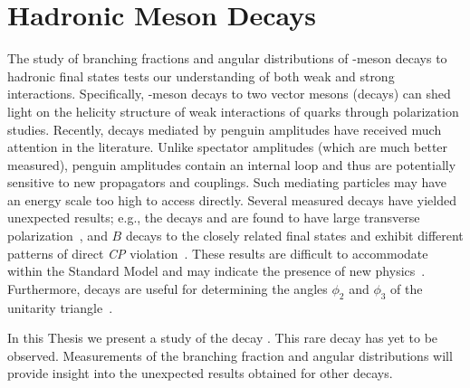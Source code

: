 \section{Hadronic \bm{\B} Meson Decays}
The study of branching fractions and angular distributions of \B-meson decays to hadronic final states tests our understanding of both weak and strong interactions. Specifically, \B-meson decays to two vector mesons (\Bvv decays) can shed light on the helicity structure of weak interactions of quarks through polarization studies. Recently, \B decays mediated by \bsqq penguin amplitudes have received much attention in the literature. Unlike \bc spectator amplitudes (which are much better measured), penguin amplitudes contain an internal loop and thus are potentially sensitive to new propagators and couplings. Such mediating particles may have an energy scale too high to access directly. Several measured \bsqq decays have yielded unexpected results; e.g., the decays \BToPhiKst and \BToRhoKstz are found to have large transverse polarization~\cite{belle_phiKstz,babar_phiKstz,belle_RhoPKstz,babar_RhoPKstz}, and $B$ decays to the closely related final states \KpPim and \KpPiz exhibit different patterns of direct \textit{CP} violation~\cite{kpiDCPV_babar, kpiDCPV_belle}. These results are difficult to accommodate within the Standard Model and may indicate the presence of new physics~\cite{Kagan QCD peng annih,Ladisa etal FSI,Cheng Chua Soni FSI,Colangelo FSI,charming penguins,magnetic penguin,new sets of form factors,Beneke etal Enhanced Electroweak Penguin Amplitudes,Li and Mishima Polarization in Bvv decays,Cheng Yang BR and Polarization in Bvv decays,Grossman Beyond the SM with B and K physics,RH currents,scalar interactions,NP operators}. Furthermore, \bsqq decays are useful for determining the angles ${\phi_{2}}$ and ${\phi_{3}}$ of the unitarity triangle~\cite{phi3_ref1,phi3_ref2,phi3_ref3}.

In this Thesis we present a study of the \bsdd decay \BzToOmeKstz. This rare \Bvv decay has yet to be observed. Measurements of the branching fraction and angular distributions will provide insight into the unexpected results obtained for other \bsqq decays.


